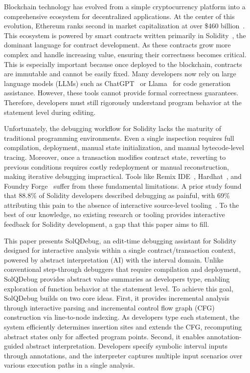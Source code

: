 \documentclass[pdflatex,sn-basic]{sn-jnl}%
\theoremstyle{thmstyleone}%
\theoremstyle{thmstyletwo}%
\theoremstyle{thmstylethree}%
\begin{document}
    Blockchain technology has evolved from a simple cryptocurrency platform into a comprehensive ecosystem for decentralized applications.
    At the center of this evolution, Ethereum ranks second in market capitalization at over \$460 billion~\citep{coinmarketcap}.
    This ecosystem is powered by smart contracts written primarily in Solidity~\citep{solidity}, the dominant language for contract development.
    As these contracts grow more complex and handle increasing value, ensuring their correctness becomes critical.
    This is especially important because once deployed to the blockchain, contracts are immutable and cannot be easily fixed.
    Many developers now rely on large language models (LLMs) such as ChatGPT~\citep{gpt} or Llama~\citep{llama} for code generation assistance.
    However, these tools cannot provide formal correctness guarantees.
    Therefore, developers must still rigorously understand program behavior at the statement level during editing.

    Unfortunately, the debugging workflow for Solidity lacks the maturity of traditional programming environments.
    Even a single inspection requires full compilation, deployment, manual state initialization, and manual bytecode-level tracing.
    Moreover, once a transaction modifies contract state, reverting to previous conditions requires costly redeployment or manual reconstruction, making iterative debugging impractical.
    Tools like Remix IDE~\citep{remix}, Hardhat~\citep{hardhat}, and Foundry Forge~\citep{forge} suffer from these fundamental limitations.
    A prior study found that 88.8\% of Solidity developers described debugging as painful, with 69\% attributing this pain to the absence of interactive source-level tooling~\citep{interview}.
    To the best of our knowledge, no existing research or tooling provides interactive feedback for Solidity development, a gap that this paper aims to fill.
    
    This paper presents SolQDebug, an edit-time debugging assistant for Solidity designed for interactive analysis within a single contract/transaction context,
    powered by abstract interpretation (AI) with the interval domain.
    Unlike conventional step-through debuggers that require compilation and deployment,
    SolQDebug provides abstract value summaries as developers type, enabling exploration of function behavior at the statement level.
    To achieve this goal, SolQDebug builds on two core ideas.
    First, it provides incremental analysis through interactive parsing and incremental control flow graph (CFG) construction via line-to-node indexing.
    As developers type each statement, the system efficiently determines insertion sites and extends the CFG, recomputing abstract states only for affected program points.
    Second, it enables annotation-guided abstract interpretation. Developers specify symbolic interval inputs through annotations,
    and the interpreter captures multiple input scenarios over various execution paths in a single analysis.
\end{document}

